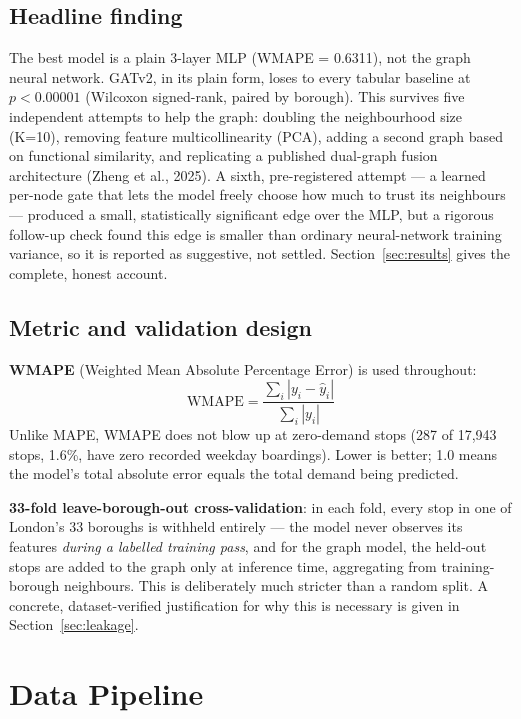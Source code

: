 \documentclass[11pt]{article}
\let\oldsection\section
\renewcommand{\section}[1]{\clearpage\oldsection{\color{sectcolor}#1}}
\let\oldsubsection\subsection
\renewcommand{\subsection}[1]{\oldsubsection{\color{sectcolor}#1}}
\begin{document}
\subsection{Headline finding}
The best model is a plain 3-layer MLP (WMAPE = 0.6311), not the graph neural network. GATv2,
in its plain form, loses to every tabular baseline at $p<0.00001$ (Wilcoxon signed-rank,
paired by borough). This survives five independent attempts to help the graph: doubling the
neighbourhood size (K=10), removing feature multicollinearity (PCA), adding a second
graph based on functional similarity, and replicating a published dual-graph fusion
architecture (Zheng et al., 2025). A sixth, pre-registered attempt --- a learned per-node
gate that lets the model freely choose how much to trust its neighbours --- produced a
small, statistically significant edge over the MLP, but a rigorous follow-up check found
this edge is smaller than ordinary neural-network training variance, so it is reported as
suggestive, not settled. Section~\ref{sec:results} gives the complete, honest account.

\subsection{Metric and validation design}
\textbf{WMAPE} (Weighted Mean Absolute Percentage Error) is used throughout:
$$\mathrm{WMAPE} = \frac{\sum_i |y_i - \hat{y}_i|}{\sum_i |y_i|}$$
Unlike MAPE, WMAPE does not blow up at zero-demand stops (287 of 17{,}943 stops, 1.6\%,
have zero recorded weekday boardings). Lower is better; 1.0 means the model's total absolute
error equals the total demand being predicted.

\textbf{33-fold leave-borough-out cross-validation}: in each fold, every stop in one of
London's 33 boroughs is withheld entirely --- the model never observes its features
\emph{during a labelled training pass}, and for the graph model, the held-out stops are
added to the graph only at inference time, aggregating from training-borough neighbours.
This is deliberately much stricter than a random split. A concrete, dataset-verified
justification for why this is necessary is given in Section~\ref{sec:leakage}.

\newpage
\section{Data Pipeline}
\end{document}

